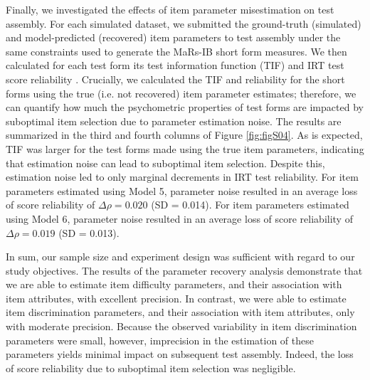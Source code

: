 \documentclass[a4paper,man,natbib]{apa6}
\begin{document}
Finally, we investigated the effects of item parameter misestimation on test assembly. For each simulated dataset, we submitted the ground-truth (simulated) and model-predicted (recovered) item parameters to test assembly under the same constraints used to generate the MaRs-IB short form measures. We then calculated for each test form its test information function (TIF) and IRT test score reliability \citep{kim2010estimation, nicewander2018conditional}. Crucially, we calculated the TIF and reliability for the short forms using the true (i.e. not recovered) item parameter estimates; therefore, we can quantify how much the psychometric properties of test forms are impacted by suboptimal item selection due to parameter estimation noise. The results are summarized in the third and fourth columns of Figure \ref{fig:figS04}. As is expected, TIF was larger for the test forms made using the true item parameters, indicating that estimation noise can lead to suboptimal item selection. Despite this, estimation noise led to only marginal decrements in IRT test reliability. For item parameters estimated using Model 5, parameter noise resulted in an average loss of score reliability of $\Delta \rho = 0.020$ (SD = 0.014). For item parameters estimated using Model 6, parameter noise resulted in an average loss of score reliability of $\Delta \rho = 0.019$ (SD = 0.013). 

In sum, our sample size and experiment design was sufficient with regard to our study objectives. The results of the parameter recovery analysis demonstrate that we are able to estimate item difficulty parameters, and their association with item attributes, with excellent precision. In contrast, we were able to estimate item discrimination parameters, and their association with item attributes, only with moderate precision. Because the observed variability in item discrimination parameters were small, however, imprecision in the estimation of these parameters yields minimal impact on subsequent test assembly. Indeed, the loss of score reliability due to suboptimal item selection was negligible. 


\end{document}
